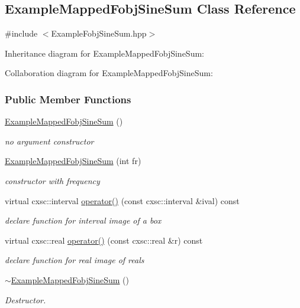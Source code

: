 \hypertarget{classExampleMappedFobjSineSum}{\subsection{\-Example\-Mapped\-Fobj\-Sine\-Sum \-Class \-Reference}
\label{classExampleMappedFobjSineSum}
}


{\ttfamily \#include $<$\-Example\-Fobj\-Sine\-Sum.\-hpp$>$}



\-Inheritance diagram for \-Example\-Mapped\-Fobj\-Sine\-Sum\-:


\-Collaboration diagram for \-Example\-Mapped\-Fobj\-Sine\-Sum\-:
\subsubsection*{\-Public \-Member \-Functions}
\begin{DoxyCompactItemize}
\item 
\hyperlink{classExampleMappedFobjSineSum_a5326ddbe84a5eaa1e725bd309e460cfc}{\-Example\-Mapped\-Fobj\-Sine\-Sum} ()
\begin{DoxyCompactList}\small\item\em no argument constructor \end{DoxyCompactList}\item 
\hyperlink{classExampleMappedFobjSineSum_a7eeb11dad969065045d3f48a79e53c1d}{\-Example\-Mapped\-Fobj\-Sine\-Sum} (int fr)
\begin{DoxyCompactList}\small\item\em constructor with frequency \end{DoxyCompactList}\item 
virtual cxsc\-::interval \hyperlink{classExampleMappedFobjSineSum_a9337fd189f5d11ed8a30f0605a5cf1eb}{operator()} (const cxsc\-::interval \&ival) const 
\begin{DoxyCompactList}\small\item\em declare function for interval image of a box \end{DoxyCompactList}\item 
virtual cxsc\-::real \hyperlink{classExampleMappedFobjSineSum_ad389bdccf155ea6356a801f5d4078c6f}{operator()} (const cxsc\-::real \&r) const 
\begin{DoxyCompactList}\small\item\em declare function for real image of reals \end{DoxyCompactList}\item 
\hyperlink{classExampleMappedFobjSineSum_a7a40f6a93ce03e5931953e49fffc12ac}{$\sim$\-Example\-Mapped\-Fobj\-Sine\-Sum} ()
\begin{DoxyCompactList}\small\item\em \-Destructor. \end{DoxyCompactList}\end{DoxyCompactItemize}
